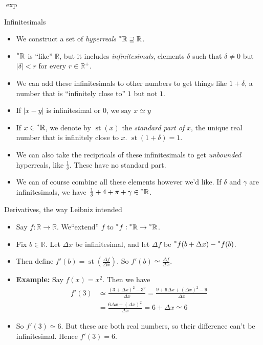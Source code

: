 \documentclass{beamer}
\theoremstyle{plain}
\theoremstyle{definition}
\newcommand{\stp}[1]{\st\left(#1\right)}
\newcommand{\reals}{\mathbb{R}}
\newcommand{\hreals}{\prescript{*}{}{\mathbb{R}}}
\newcommand{\hr}[1]{\prescript{*}{}{#1}}
\DeclareMathOperator{\st}{st}
\begin{document}
\begin{frame}{$\exp$}

\begin{frame}{Infinitesimals}
\begin{itemize}
	\item We construct a set of \textit{hyperreals} $\hreals \supseteq \reals$.
	\item $\hreals$ is ``like'' $\reals$, but it includes \textit{infinitesimals}, elements $\delta$ such that $\delta \neq 0$ but $|\delta| < r$ for every $r \in \reals^+$.
	\item We can add these infinitesimals to other numbers to get things like $1 + \delta$, a number that is ``infinitely close to'' $1$ but not $1$. 
	\item If $|x - y|$ is infinitesimal or $0$, we say $x \simeq y$
	\item If $x \in \hreals$, we denote by $\st(x)$ the \textit{standard part of} $x$, the unique real number that is infinitely close to $x$. $\st(1 + \delta) = 1$. 
	\item We can also take the recipricals of these infinitesimals to get \textit{unbounded} hyperreals, like $\frac{1}{\delta}$. These have no standard part.
	\item We can of course combine all these elements however we'd like. If $\delta$ and $\gamma$ are infinitesimals, we have $\frac{1}{\delta} + 4 + \pi + \gamma \in \hreals$.
\end{itemize}
\end{frame}

\begin{frame}{Derivatives, the way Leibniz intended}
\begin{itemize}
	\item Say $f: \reals \to \reals$. We``extend'' $f$ to $\hr{f}: \hreals \to \hreals$.
	\item Fix $b \in \reals$. Let $\Delta x$ be infinitesimal, and let $\Delta f$ be $\hr{f}(b + \Delta x) - \hr{f}(b)$.
	\item Then define $f'(b) = \stp{\frac{\Delta f}{\Delta x}}$. So $f'(b) \simeq \frac{\Delta f}{\Delta x}$.
	\item \textbf{Example:} Say $f(x) = x^2$. Then we have 
	\begin{align*}
	f'(3) &\simeq \frac{(3 + \Delta x)^2 - 3^2}{\Delta x} = \frac{9 + 6 \Delta x + (\Delta x)^2 - 9}{\Delta x} \\
		&= \frac{6 \Delta x + (\Delta x)^2}{\Delta x} = 6 + \Delta x \simeq 6
	\end{align*}
	\item So $f'(3) \simeq 6$. But these are both real numbers, so their difference can't be infinitesimal. Hence $f'(3) = 6$.
\end{itemize}
\end{frame}


\end{frame}
\end{document}
